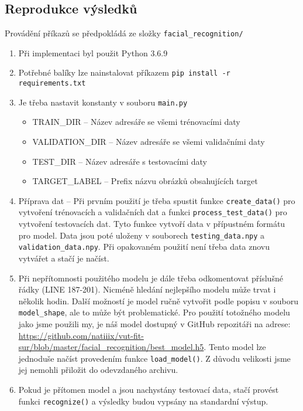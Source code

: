 \documentclass[a4paper,11pt]{article}
\begin{document}
		\subsection{Reprodukce výsledků}
			Provádění příkazů se předpokládá ze složky \texttt{facial\_recognition/}
			\begin{enumerate}
				\item Při implementaci byl použit Python 3.6.9
				\item Potřebné balíky lze nainstalovat příkazem \texttt{pip install -r requirements.txt}
				\item Je třeba nastavit konstanty v souboru \texttt{main.py}
					\begin{itemize}
						\item TRAIN\_DIR -- Název adresáře se všemi trénovacími daty
						\item VALIDATION\_DIR -- Název adresáře se všemi validačními daty
						\item TEST\_DIR -- Název adresáře s testovacími daty
						\item TARGET\_LABEL -- Prefix názvu obrázků obsahujících target
					\end{itemize}
				\item Příprava dat -- Při prvním použití je třeba spustit funkce \texttt{create\_data()} pro vytvoření trénovacích a validačních dat a funkci \texttt{process\_test\_data()} pro vytvoření testovacích dat. Tyto funkce vytvoří data v přípustném formátu pro model. Data jsou poté uloženy v souborech \texttt{testing\_data.npy} a \texttt{validation\_data.npy}. Při opakovaném použití není třeba data znovu vytvářet a stačí je načíst.
				\item Při nepřítomnosti použitého modelu je dále třeba odkomentovat příslušné řádky (LINE 187-201). Nicméně hledání nejlepšího modelu může trvat i několik hodin. Další možností je model ručně vytvořit podle popisu v souboru \texttt{model\_shape}, ale to může být problematické. Pro použití totožného modelu jako jsme použili my, je náš model dostupný v GitHub repozitáři na adrese: \url{https://github.com/natiiix/vut-fit-sur/blob/master/facial_recognition/best_model.h5}. Tento model lze jednoduše načíst provedením funkce \texttt{load\_model()}. Z důvodu velikosti jsme jej nemohli přiložit do odevzdaného archivu.
				\item Pokud je přítomen model a jsou nachystány testovací data, stačí provést funkci \texttt{recognize()} a výsledky budou vypsány na standardní výstup. 
			\end{enumerate}
		
\end{document}
